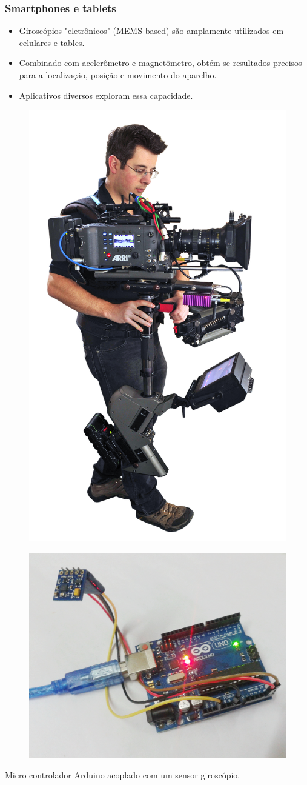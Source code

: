 \documentclass{beamer}
\begin{document}
\begin{frame}
\frametitle{Smartphones e tablets}
\begin{itemize}
\item Giroscópios "eletrônicos" (MEMS-based) são amplamente utilizados em celulares e tables.
\item Combinado com acelerômetro e magnetômetro, obtém-se resultados precisos para a localização, posição e movimento do aparelho.
\item Aplicativos diversos exploram essa capacidade.
\end{itemize}
\end{frame}




\begin{frame}
\begin{figure}
\includegraphics[width=2.0 in]{figuras/camera.jpg}
\end{figure}
\end{frame}


\begin{frame}
\begin{figure}
\includegraphics[width=3.5 in]{figuras/Arduino.jpg}
\end{figure}
Micro controlador Arduino acoplado com um sensor giroscópio.
\end{frame}
\end{document}
